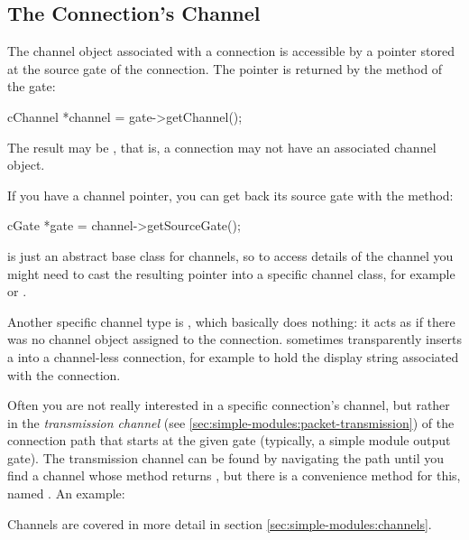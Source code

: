\subsection{The Connection's Channel}

The channel object associated with a connection is accessible by
a pointer stored at the source gate of the connection. The pointer
is returned by the  method of the gate:

\begin{cpp}
cChannel *channel = gate->getChannel();
\end{cpp}

The result may be , that is, a connection may not have
an associated channel object.

If you have a channel pointer, you can get back its source gate
with the  method:

\begin{cpp}
cGate *gate = channel->getSourceGate();
\end{cpp}

 is just an abstract base class for channels, so
to access details of the channel you might need to cast the resulting
pointer into a specific channel class, for example 
or .

Another specific channel type is , which basically
does nothing: it acts as if there was no channel object assigned to the
connection. {\opp} sometimes transparently inserts a 
into a channel-less connection, for example to hold the display string
associated with the connection.

Often you are not really interested in a specific connection's channel,
but rather in the \textit{transmission channel} (see
\ref{sec:simple-modules:packet-transmission}) of the connection path
that starts at the given gate (typically, a simple module output gate).
The transmission channel can be found by navigating the path until
you find a channel whose  method returns
, but there is a convenience method for this, named
. An example:


Channels are covered in more detail in section \ref{sec:simple-modules:channels}.


